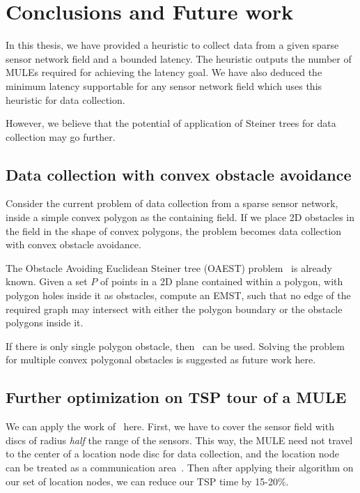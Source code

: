 \chapter{Conclusions and Future work}
\label{chap:concl}

In this thesis, we have provided a heuristic to collect data from a given sparse sensor network field and a bounded latency. The heuristic outputs the number of MULEs required for achieving the latency goal. We have also deduced the minimum latency supportable for any sensor network field which uses this heuristic for data collection.

However, we believe that the potential of application of Steiner trees for data collection may go further.

\section{Data collection with convex obstacle avoidance}

Consider the current problem of data collection from a sparse sensor network, inside a simple convex polygon as the containing field. If we place 2D obstacles in the field in the shape of convex polygons, the problem becomes data collection with convex obstacle avoidance.

The Obstacle Avoiding Euclidean Steiner tree (OAEST) problem~\cite{oaest99} is already known. Given a set $P$ of points in a 2D plane contained within a polygon, with polygon holes inside it as obstacles, compute an EMST, such that no edge of the required graph may intersect with either the polygon boundary or the obstacle polygons inside it.

If there is only single polygon obstacle, then~\cite{oatsp} can be used. Solving the problem for multiple convex polygonal obstacles is suggested as future work here.

\section{Further optimization on TSP tour of a MULE}

We can apply the work of~\cite{conHull} here. First, we have to cover the sensor field with discs of radius \emph{half} the range of the sensors. This way, the MULE need not travel to the center of a location node disc for data collection, and the location node can be treated as a communication area~\cite{conHull}. Then after applying their algorithm on our set of location nodes, we can reduce our TSP time by 15-20\%.

\singlespacing
